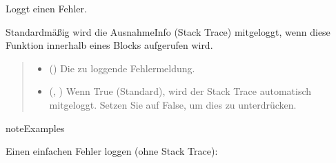 \documentclass[letterpaper,10pt,english]{sphinxmanual}
\begin{document}
\begin{fulllineitems}

\begin{fulllineitems}
\label{\detokenize{modulab/log_manager:modules.log.LogManager.LogManager.error}}
\pysigstartsignatures
\pysiglinewithargsret
{}
{\sphinxparamcomma {}}
{}
\pysigstopsignatures
\sphinxAtStartPar
Loggt einen Fehler.

\sphinxAtStartPar
Standardmäßig wird die Ausnahme\sphinxhyphen{}Info (Stack Trace) mitgeloggt,
wenn diese Funktion innerhalb eines \sphinxhyphen{}Blocks aufgerufen wird.
\begin{quote}\begin{description}
\begin{itemize}
\item {} 
\sphinxAtStartPar
{} () \textendash{} Die zu loggende Fehlermeldung.

\item {} 
\sphinxAtStartPar
{} (, ) \textendash{} Wenn True (Standard), wird der
Stack Trace automatisch mitgeloggt.
Setzen Sie auf False, um dies zu unterdrücken.

\end{itemize}

\end{description}\end{quote}

\begin{sphinxadmonition}{note}{Examples}

\sphinxAtStartPar
Einen einfachen Fehler loggen (ohne Stack Trace):

\begin{sphinxVerbatim}[commandchars=\\\{\}]
  
     
\end{sphinxVerbatim}


\end{sphinxadmonition}
\end{fulllineitems}
\end{fulllineitems}
\end{document}
